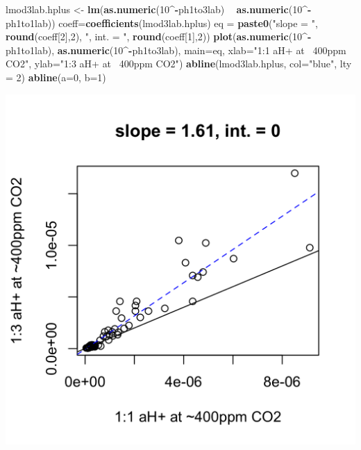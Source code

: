 \documentclass[]{article}
\newenvironment{Shaded}{\begin{snugshade}}{\end{snugshade}}
\newcommand{\DataTypeTok}[1]{\textcolor[rgb]{0.13,0.29,0.53}{#1}}
\newcommand{\DecValTok}[1]{\textcolor[rgb]{0.00,0.00,0.81}{#1}}
\newcommand{\KeywordTok}[1]{\textcolor[rgb]{0.13,0.29,0.53}{\textbf{#1}}}
\newcommand{\NormalTok}[1]{#1}
\newcommand{\OperatorTok}[1]{\textcolor[rgb]{0.81,0.36,0.00}{\textbf{#1}}}
\newcommand{\StringTok}[1]{\textcolor[rgb]{0.31,0.60,0.02}{#1}}
\begin{document}
\begin{Shaded}
\begin{Highlighting}[]
\NormalTok{lmod3lab.hplus <-}\StringTok{ }\KeywordTok{lm}\NormalTok{(}\KeywordTok{as.numeric}\NormalTok{(}\DecValTok{10}\OperatorTok{^-}\NormalTok{ph1to3lab) }\OperatorTok{~}\StringTok{ }\KeywordTok{as.numeric}\NormalTok{(}\DecValTok{10}\OperatorTok{^-}\NormalTok{ph1to1lab))}
\NormalTok{coeff=}\KeywordTok{coefficients}\NormalTok{(lmod3lab.hplus)}
\NormalTok{eq =}\StringTok{ }\KeywordTok{paste0}\NormalTok{(}\StringTok{"slope = "}\NormalTok{, }\KeywordTok{round}\NormalTok{(coeff[}\DecValTok{2}\NormalTok{],}\DecValTok{2}\NormalTok{), }\StringTok{", int. = "}\NormalTok{, }\KeywordTok{round}\NormalTok{(coeff[}\DecValTok{1}\NormalTok{],}\DecValTok{2}\NormalTok{))}
\KeywordTok{plot}\NormalTok{(}\KeywordTok{as.numeric}\NormalTok{(}\DecValTok{10}\OperatorTok{^-}\NormalTok{ph1to1lab), }\KeywordTok{as.numeric}\NormalTok{(}\DecValTok{10}\OperatorTok{^-}\NormalTok{ph1to3lab), }\DataTypeTok{main=}\NormalTok{eq,}
   \DataTypeTok{xlab=}\StringTok{"1:1 aH+ at ~400ppm CO2"}\NormalTok{, }\DataTypeTok{ylab=}\StringTok{"1:3 aH+ at ~400ppm CO2"}\NormalTok{)}
\KeywordTok{abline}\NormalTok{(lmod3lab.hplus, }\DataTypeTok{col=}\StringTok{"blue"}\NormalTok{, }\DataTypeTok{lty =} \DecValTok{2}\NormalTok{)}
\KeywordTok{abline}\NormalTok{(}\DataTypeTok{a=}\DecValTok{0}\NormalTok{, }\DataTypeTok{b=}\DecValTok{1}\NormalTok{)}
\end{Highlighting}
\end{Shaded}

\includegraphics{output-rmd/whitman-figure-request-3-lab-hplus-wisc-1.png}
\end{document}
